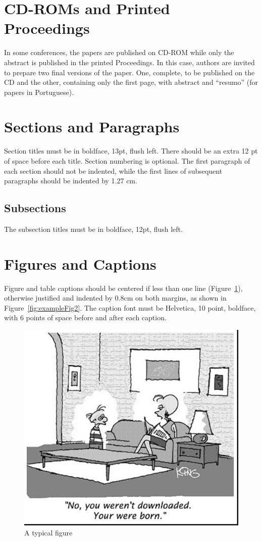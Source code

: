 \documentclass[12pt]{article}
\begin{document}
\section{CD-ROMs and Printed Proceedings}

In some conferences, the papers are published on CD-ROM while only the
abstract is published in the printed Proceedings. In this case, authors are
invited to prepare two final versions of the paper. One, complete, to be
published on the CD and the other, containing only the first page, with
abstract and ``resumo'' (for papers in Portuguese).

\section{Sections and Paragraphs}

Section titles must be in boldface, 13pt, flush left. There should be an extra
12 pt of space before each title. Section numbering is optional. The first
paragraph of each section should not be indented, while the first lines of
subsequent paragraphs should be indented by 1.27 cm.

\subsection{Subsections}

The subsection titles must be in boldface, 12pt, flush left.

\section{Figures and Captions}\label{sec:figs}


Figure and table captions should be centered if less than one line
(Figure~\ref{fig:exampleFig1}), otherwise justified and indented by 0.8cm on
both margins, as shown in Figure~\ref{fig:exampleFig2}. The caption font must
be Helvetica, 10 point, boldface, with 6 points of space before and after each
caption.

\begin{figure}[ht]
\centering
\includegraphics[width=.5\textwidth]{fig1.jpg}
\caption{A typical figure}
\label{fig:exampleFig1}
\end{figure}
\end{document}
